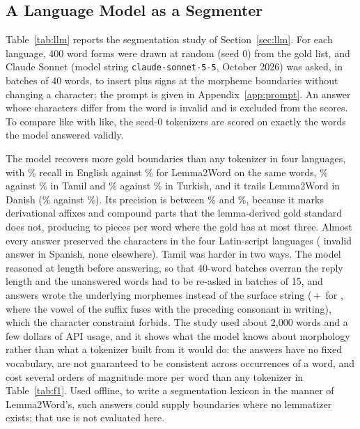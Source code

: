 \subsection{A Language Model as a Segmenter}\label{sec:res-llm}
Table~\ref{tab:llm} reports the segmentation study of Section~\ref{sec:llm}.
For each language, 400 word forms were drawn at random (seed 0) from the gold list, and Claude Sonnet (model string \texttt{claude-sonnet-5-5}, October 2026) was asked, in batches of 40 words, to insert plus signs at the morpheme boundaries without changing a character; the prompt is given in Appendix~\ref{app:prompt}.
An answer whose characters differ from the word is invalid and is excluded from the scores.
To compare like with like, the seed-0 tokenizers are scored on exactly the words the model answered validly.



The model recovers more gold boundaries than any tokenizer in four languages, with \nLlmREnglish\% recall in English against \nLlmSampleLtwREnglish\% for Lemma2Word on the same words, \nLlmRTamil\% against \nLlmSampleLtwRTamil\% in Tamil and \nLlmRTurkish\% against \nLlmSampleLtwRTurkish\% in Turkish, and it trails Lemma2Word in Danish (\nLlmRDanish\% against \nLlmSampleLtwRDanish\%).
Its precision is between \nLlmPSpanish\% and \nLlmPEnglish\%, because it marks derivational affixes and compound parts that the lemma-derived gold standard does not, producing \nLlmTpwEnglish{} to \nLlmTpwSpanish{} pieces per word where the gold has at most three.
Almost every answer preserved the characters in the four Latin-script languages (\nLlmInvalidSpanish{} invalid answer in Spanish, none elsewhere).
Tamil was harder in two ways.
The model reasoned at length before answering, so that 40-word batches overran the reply length and the unanswered words had to be re-asked in batches of 15, and \nLlmInvalidTamil{} answers wrote the underlying morphemes instead of the surface string (\,+\, for , where the vowel of the suffix fuses with the preceding consonant in writing), which the character constraint forbids.
The study used about 2,000 words and a few dollars of API usage, and it shows what the model knows about morphology rather than what a tokenizer built from it would do: the answers have no fixed vocabulary, are not guaranteed to be consistent across occurrences of a word, and cost several orders of magnitude more per word than any tokenizer in Table~\ref{tab:f1}.
Used offline, to write a segmentation lexicon in the manner of Lemma2Word's, such answers could supply boundaries where no lemmatizer exists; that use is not evaluated here.
